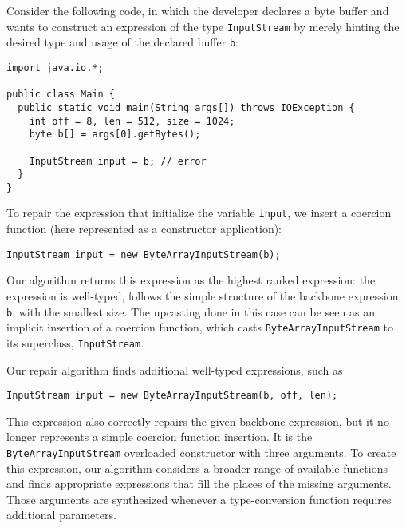 Consider the following code, in which the developer declares a byte buffer and
wants to construct an expression of the type \lstinline{InputStream} by merely hinting
the desired type and usage of the declared buffer \lstinline{b}:
\begin{lstlisting}
import java.io.*;

public class Main {
  public static void main(String args[]) throws IOException {
    int off = 8, len = 512, size = 1024;
    byte b[] = args[0].getBytes();
    
    InputStream input = b; // error
  }
}
\end{lstlisting}
To repair the expression that initialize the variable \lstinline{input}, 
we insert a coercion function (here represented as a constructor application):
\begin{lstlisting}    
InputStream input = new ByteArrayInputStream(b);
\end{lstlisting}
Our algorithm returns this expression as the highest ranked expression: 
the expression is well-typed, follows the simple structure of the backbone
expression \lstinline{b}, with the smallest size.
The upcasting done in this case can be seen as an implicit insertion of 
a coercion function, which casts \lstinline{ByteArrayInputStream} to
its superclass, \lstinline{InputStream}.

Our repair algorithm finds additional well-typed expressions, such as 
\begin{lstlisting}    
InputStream input = new ByteArrayInputStream(b, off, len);
\end{lstlisting}
This expression also correctly
repairs the given backbone expression, but it no longer represents a simple coercion
function insertion. It is the \lstinline{ByteArrayInputStream} overloaded 
constructor with three arguments. To create this expression, our algorithm
considers a broader range of available functions and finds appropriate
expressions that fill the places of the missing arguments. Those arguments
are synthesized whenever a type-conversion function requires additional parameters.



